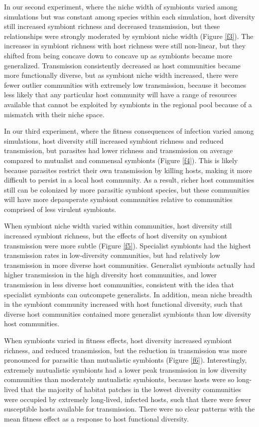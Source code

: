 \documentclass[12pt]{article}
\begin{document}
In our second experiment, where the niche width of symbionts varied among simulations but was constant among species within each simulation, host diversity still increased symbiont richness and decreased transmission, but these relationships were strongly moderated by symbiont niche width (Figure \ref{f3}). 
The increases in symbiont richness with host richness were still non-linear, but they shifted from being concave down to concave up as symbionts became more generalized. 
Transmission consistently decreased as host communities became more functionally diverse, but as symbiont niche width increased, there were fewer outlier communities with extremely low transmission, because it becomes less likely that any particular host community will have a range of resources available that cannot be exploited by symbionts in the regional pool because of a mismatch with their niche space.

In our third experiment, where the fitness consequences of infection varied among simulations, host diversity still increased symbiont richness and reduced transmission, but parasites had lower richness and transmission on average compared to mutualist and commensal symbionts (Figure \ref{f4}). 
This is likely because parasites restrict their own transmission by killing hosts, making it more difficult to persist in a local host community. 
As a result, richer host communities still can be colonized by more parasitic symbiont species, but these communities will have more depauperate symbiont communities relative to communities comprised of less virulent symbionts. 

When symbiont niche width varied within communities, host diversity still increased symbiont richness, but the effects of host diversity on symbiont transmission were more subtle (Figure \ref{f5}). 
Specialist symbionts had the highest transmission rates in low-diversity communities, but had relatively low transmission in more diverse host communities. 
Generalist symbionts actually had higher transmission in the high diversity host communities, and lower transmission in less diverse host communities, consistent with the idea that specialist symbionts can outcompete generalists.
In addition, mean niche breadth in the symbiont community increased with host functional diversity, such that diverse host communities contained more generalist symbionts than low diversity host communities. 

When symbionts varied in fitness effects, host diversity increased symbiont richness, and reduced transmission, but the reduction in transmission was more pronounced for parasitic than mutualistic symbionts (Figure \ref{f6}). 
Interestingly, extremely mutualistic symbionts had a lower peak transmission in low diversity communities than moderately mutualistic symbionts, because hosts were so long-lived that the majority of habitat patches in the lowest diversity communities were occupied by extremely long-lived, infected hosts, such that there were fewer susceptible hosts available for transmission. 
There were no clear patterns with the mean fitness effect as a response to host functional diversity. 
\end{document}
